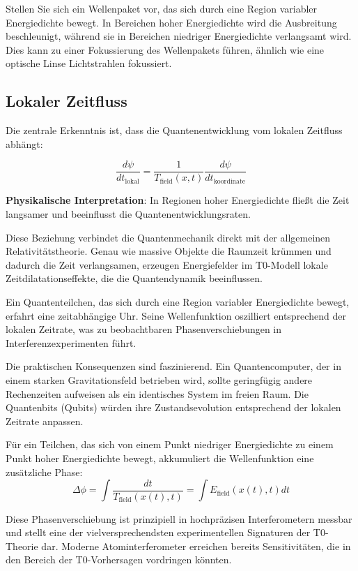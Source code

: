 \documentclass[12pt,a4paper]{article}
\theoremstyle{definition}
\theoremstyle{remark}
\begin{document}
Stellen Sie sich ein Wellenpaket vor, das sich durch eine Region variabler Energiedichte bewegt. In Bereichen hoher Energiedichte wird die Ausbreitung beschleunigt, während sie in Bereichen niedriger Energiedichte verlangsamt wird. Dies kann zu einer Fokussierung des Wellenpakets führen, ähnlich wie eine optische Linse Lichtstrahlen fokussiert.

\subsection{Lokaler Zeitfluss}

Die zentrale Erkenntnis ist, dass die Quantenentwicklung vom lokalen Zeitfluss abhängt:

\begin{equation}
	\frac{d\psi}{dt_{\text{lokal}}} = \frac{1}{T_{\text{field}}(x,t)} \frac{d\psi}{dt_{\text{koordinate}}}
	\label{eq:local_time_flow}
\end{equation}

\textbf{Physikalische Interpretation}: In Regionen hoher Energiedichte fließt die Zeit langsamer und beeinflusst die Quantenentwicklungsraten.

Diese Beziehung verbindet die Quantenmechanik direkt mit der allgemeinen Relativitätstheorie. Genau wie massive Objekte die Raumzeit krümmen und dadurch die Zeit verlangsamen, erzeugen Energiefelder im T0-Modell lokale Zeitdilatationseffekte, die die Quantendynamik beeinflussen.

Ein Quantenteilchen, das sich durch eine Region variabler Energiedichte bewegt, erfahrt eine zeitabhängige Uhr. Seine Wellenfunktion oszilliert entsprechend der lokalen Zeitrate, was zu beobachtbaren Phasenverschiebungen in Interferenzexperimenten führt.

Die praktischen Konsequenzen sind faszinierend. Ein Quantencomputer, der in einem starken Gravitationsfeld betrieben wird, sollte geringfügig andere Rechenzeiten aufweisen als ein identisches System im freien Raum. Die Quantenbits (Qubits) würden ihre Zustandsevolution entsprechend der lokalen Zeitrate anpassen.

Für ein Teilchen, das sich von einem Punkt niedriger Energiedichte zu einem Punkt hoher Energiedichte bewegt, akkumuliert die Wellenfunktion eine zusätzliche Phase:
$$\Delta \phi = \int \frac{dt}{T_{\text{field}}(x(t), t)} = \int E_{\text{field}}(x(t), t) dt$$

Diese Phasenverschiebung ist prinzipiell in hochpräzisen Interferometern messbar und stellt eine der vielversprechendsten experimentellen Signaturen der T0-Theorie dar. Moderne Atominterferometer erreichen bereits Sensitivitäten, die in den Bereich der T0-Vorhersagen vordringen könnten.
\end{document}
